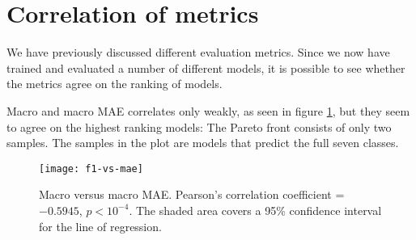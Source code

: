 \section{Correlation of metrics}

We have previously discussed different evaluation metrics. Since we now have
trained and evaluated a number of different models, it is possible to see whether
the metrics agree on the ranking of models.

Macro \FI and macro \ac{MAE} correlates only weakly, as seen in figure
\ref{fig:f1-vs-mae}, but they seem to agree on the highest ranking models:
The Pareto front consists of only two samples. The samples in the plot are
models that predict the full seven classes.

\begin{figure}
  \centering
  \texttt{[image: f1-vs-mae]}
  \caption{Macro \FI versus macro MAE. Pearson's correlation coefficient = $-0.5945$, $p < 10^{-4}$.
           The shaded area covers a 95\% confidence interval for the line of regression.}
  \label{fig:f1-vs-mae}
\end{figure}

